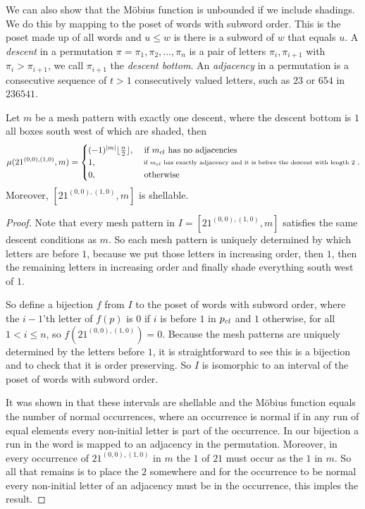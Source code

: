 \documentclass[11pt,a4paper,oneside]{article}
\begin{document}
We can also show that the M\"obius function is unbounded if we include shadings.
We do this by mapping to the poset of words with subword order.
This is the poset made up of all words and $u\le w$ is there is a subword of $w$
that equals $u$.
A \emph{descent} in a permutation $\pi=\pi_1,\pi_2,\ldots,\pi_n$ is a pair of
letters $\pi_i,\pi_{i+1}$ with $\pi_{i}>\pi_{i+1}$, we call $\pi_{i+1}$ the \emph{descent bottom}.
An \emph{adjacency} in a permutation is a consecutive sequence of $t>1$ consecutively valued letters,
such as $23$ or $654$ in $236541$.

\begin{lem}\label{lem:mobUn}
Let $m$ be a mesh pattern with exactly one descent, where the descent bottom is
$1$ all boxes south west of which are shaded, then
$$
\mu(21^{(0,0),(1,0)},m)=\begin{cases}
(-1)^{|m|}\lfloor\frac{n}{2}\rfloor,&\mbox{ if } m_{cl} \mbox{ has no adjacencies}\\
1,&\substack{ \text{ if } m_{cl} \text{ has exactly adjacency and it is before the descent with length }2}\\
0, &\mbox{ otherwise}
\end{cases}.
$$
Moreover, $[21^{(0,0),(1,0)},m]$ is shellable.
\begin{proof}
Note that every mesh pattern in $I=[21^{(0,0),(1,0)},m]$ satisfies the same
descent conditions as $m$. So each mesh pattern is uniquely determined by 
which letters are before $1$, because we put those letters in increasing order, 
then $1$, then the remaining letters in increasing order and finally shade 
everything south west of $1$.

So define a bijection $f$ from $I$ to
the poset of words with subword order, where the $i-1$'th letter of $f(p)$ is $0$
if $i$ is before $1$ in $p_{cl}$ and $1$ otherwise, for all
$1<i\le n$, so $f(21^{(0,0),(1,0)})=0$.
Because the mesh patterns are uniquely determined by the letters before $1$,
it is straightforward to see this is a bijection and to
check that it is order preserving. So $I$ is isomorphic to an interval of the
poset of words with subword order.

 It was shown in \cite{Bjo90} that these
intervals are shellable and the M\"obius function equals the number of normal
occurrences, where an occurrence is normal if in any run of equal elements every
non-initial letter is part of the occurrence. In our bijection a run in the word
is mapped to an adjacency in the permutation. Moreover, in every occurrence of
$21^{(0,0),(1,0)}$ in $m$ the $1$ of $21$ must occur as the $1$ in $m$. So 
all that remains is to place the $2$ somewhere and for the occurrence to be normal
every non-initial letter of an adjacency must be in the occurrence, this imples the result.
\end{proof}
\end{lem}
\end{document}
